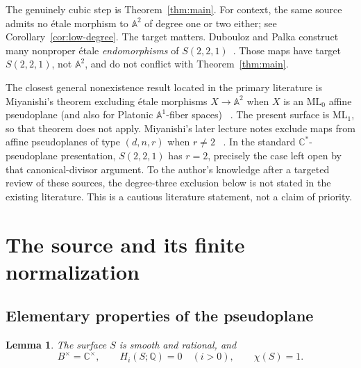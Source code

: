\documentclass[11pt]{article}
\newtheorem{lemma}[theorem]{Lemma}
\theoremstyle{definition}
\theoremstyle{remark}
\newcommand{\A}{\mathbb A}
\newcommand{\C}{\mathbb C}
\newcommand{\Q}{\mathbb Q}
\begin{document}
The genuinely cubic step is Theorem~\ref{thm:main}.  For context, the
same source admits no \'etale morphism to \(\A^2\) of degree one or two
either; see Corollary~\ref{cor:low-degree}.  The target matters.
Dubouloz and Palka construct many nonproper \'etale
\emph{endomorphisms} of \(S(2,2,1)\)~\cite{DuboulozPalka}.  Those maps
have target \(S(2,2,1)\), not \(\A^2\), and do not conflict with
Theorem~\ref{thm:main}.

The closest general nonexistence result located in the primary
literature is Miyanishi's theorem excluding \'etale morphisms
\(X\to\A^2\) when \(X\) is an \(\mathrm{ML}_0\) affine pseudoplane
(and also for Platonic \(\A^1\)-fiber spaces)
~\cite[Theorem 2.9]{Miyanishi}.  The present surface is
\(\mathrm{ML}_1\), so that theorem does not apply.  Miyanishi's later
lecture notes exclude maps from affine pseudoplanes of type
\((d,n,r)\) when \(r\ne2\)
~\cite[Theorem 2.4.10]{MiyanishiLectures}.  In the standard
\(\C^*\)-pseudoplane presentation, \(S(2,2,1)\) has \(r=2\), precisely
the case left open by that canonical-divisor argument.  To the
author's knowledge after a targeted review of these sources, the
degree-three exclusion below is not stated in the existing literature.
This is a cautious literature statement, not a claim of priority.

\section{The source and its finite normalization}

\subsection{Elementary properties of the pseudoplane}

\begin{lemma}\label{lem:source}
The surface \(S\) is smooth and rational, and
\[
 B^\times=\C^\times,\qquad
 H_i(S;\Q)=0\quad(i>0),\qquad \chi(S)=1.
\]
\end{lemma}
\end{document}
